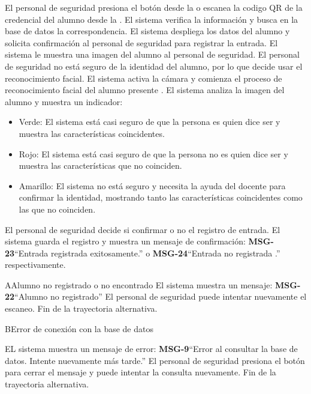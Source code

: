 \begin{UCtrayectoria}
\UCpaso[\UCactor] El personal de seguridad presiona el botón  desde la  o escanea la codigo QR de la credencial del alumno desde la .
\UCpaso El sistema verifica la información y busca en la base de datos la correspondencia.  
\UCpaso El sistema despliega los datos del alumno y solicita confirmación al personal de seguridad para registrar la entrada.
\UCpaso El sistema le muestra una imagen del alumno al personal de seguridad.
\UCpaso[\UCactor] El personal de seguridad no está seguro de la identidad del alumno, por lo que decide usar el reconocimiento facial.  
\UCpaso El sistema activa la cámara y comienza el proceso de reconocimiento facial del alumno presente . 
\UCpaso El sistema analiza la imagen del alumno y muestra un indicador:
\begin{itemize}
	\item Verde: El sistema está casi seguro de que la persona es quien dice ser y muestra las características coincidentes.
	\item Rojo: El sistema está casi seguro de que la persona no es quien dice ser y muestra las características que no coinciden. 
	\item Amarillo: El sistema no está seguro y necesita la ayuda del docente para confirmar la identidad, mostrando tanto las características coincidentes como las que no coinciden. 
\end{itemize}
\UCpaso[\UCactor] El personal de seguridad decide si confirmar o no el registro de entrada.
\UCpaso El sistema guarda el registro y muestra un mensaje de confirmación: {\bf MSG-23}{``Entrada registrada exitosamente.''} o {\bf MSG-24}{``Entrada no registrada .''} respectivamente.
\end{UCtrayectoria}
\begin{UCtrayectoriaA}{A}{Alumno no registrado o no encontrado}
\UCpaso El sistema muestra un mensaje: {\bf MSG-22}{``Alumno no registrado''}
\UCpaso[\UCactor] El personal de seguridad puede intentar nuevamente el escaneo.
\UCpaso Fin de la trayectoria alternativa.
\end{UCtrayectoriaA}
\begin{UCtrayectoriaA}{B}{Error de conexión con la base de datos}

\UCpaso EL sistema muestra un mensaje de error: {\bf MSG-9}{``Error al consultar la base de datos. Intente nuevamente más tarde.''}
\UCpaso[\UCactor] El personal de seguridad presiona el botón  para cerrar el mensaje y puede intentar la consulta nuevamente.
\UCpaso Fin de la trayectoria alternativa.
\end{UCtrayectoriaA}
